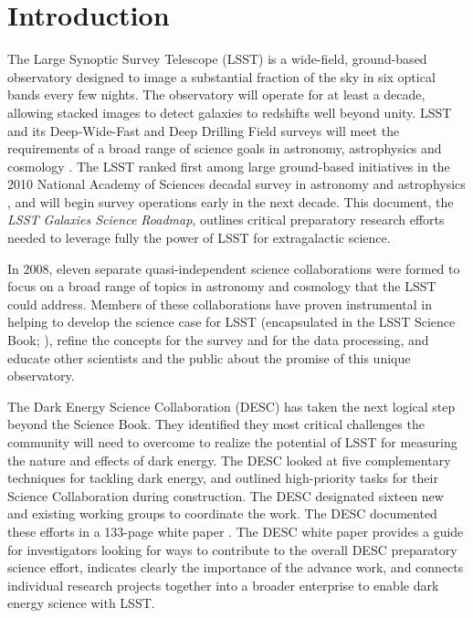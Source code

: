 
\chapter[Introduction]{Introduction}
\label{ch:intro}

{\justify
The Large Synoptic Survey Telescope (LSST) is a wide-field, ground-based
observatory designed to image a substantial fraction of the sky in six optical
bands every few nights. 
The observatory will operate for at least a decade, allowing 
stacked images to detect galaxies to redshifts well beyond unity. LSST and
its Deep-Wide-Fast and Deep Drilling Field surveys will meet 
the requirements of a broad range of science goals in astronomy, astrophysics and cosmology
\citep{ivezic2008a}. 
The LSST ranked first among large ground-based initiatives in the
2010 National Academy of Sciences decadal survey in astronomy and astrophysics \citep{nrc2010a},
and will begin survey operations early in the next decade.
This document, the {\it LSST Galaxies Science Roadmap}, outlines critical preparatory research efforts needed 
to leverage fully the power of LSST for extragalactic science. 

In 2008, eleven separate quasi-independent science collaborations were formed to
focus on a broad range of topics in astronomy and cosmology that the LSST could
address. Members of these collaborations have proven instrumental in helping to
develop the science case for LSST (encapsulated in the LSST Science Book;
\citealt{LSSTSciBook}), 
refine the concepts for the survey and for the data processing, and educate
other scientists and the public about the promise of this unique observatory.

The Dark Energy Science Collaboration (DESC) has taken the
next logical step beyond the Science Book. They identified they most critical
challenges the community will need to overcome
to realize the potential of LSST for
measuring the nature and effects of dark energy. The
DESC looked at five complementary
techniques for tackling dark energy, and outlined high-priority tasks for their
Science Collaboration during construction. The DESC designated sixteen 
new and existing working
groups to coordinate the work. The DESC documented these efforts
in a 133-page white paper \citep{LSSTDESC}. The DESC white
paper provides a guide for investigators looking for ways to contribute to the
overall DESC preparatory science effort, 
indicates clearly the importance of the advance work, and 
connects individual research projects together into a broader 
enterprise to enable dark energy science with LSST.

}
